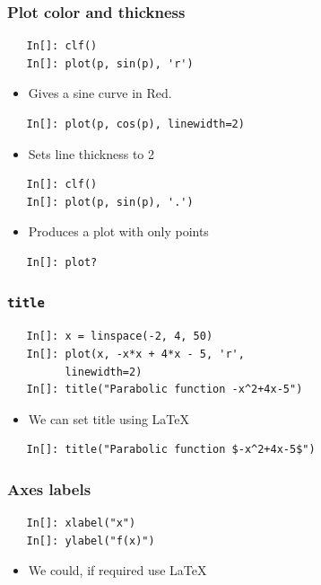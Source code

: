 \begin{frame}[fragile]
  \frametitle{Plot color and thickness}
  \begin{lstlisting}
   In[]: clf()
   In[]: plot(p, sin(p), 'r')
  \end{lstlisting}
  \begin{itemize}
  \item Gives a sine curve in Red. 
  \end{itemize}
  \begin{lstlisting}
   In[]: plot(p, cos(p), linewidth=2)
  \end{lstlisting}
  \begin{itemize}
  \item Sets line thickness to 2
  \end{itemize}
  \begin{lstlisting}
   In[]: clf()
   In[]: plot(p, sin(p), '.')
  \end{lstlisting}
  \begin{itemize}
  \item Produces a plot with only points
  \end{itemize}
  \begin{lstlisting}
   In[]: plot?
  \end{lstlisting}
\end{frame}

\begin{frame}[fragile]
  \frametitle{\texttt{title}}
  \begin{lstlisting}
   In[]: x = linspace(-2, 4, 50)
   In[]: plot(x, -x*x + 4*x - 5, 'r', 
         linewidth=2)
   In[]: title("Parabolic function -x^2+4x-5")
  \end{lstlisting}
  \begin{itemize}
  \item We can set title using \LaTeX~ 
  \end{itemize}
  \begin{lstlisting}
   In[]: title("Parabolic function $-x^2+4x-5$")
  \end{lstlisting} 
\end{frame}

\begin{frame}[fragile]
  \frametitle{Axes labels}
  \begin{lstlisting}
   In[]: xlabel("x")
   In[]: ylabel("f(x)")
  \end{lstlisting}
  \begin{itemize}
  \item We could, if required use \LaTeX~ 
  \end{itemize}
\end{frame}

